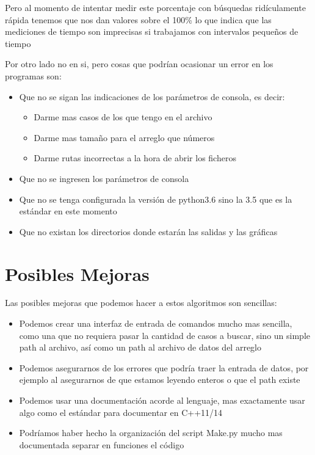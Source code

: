\documentclass[12pt, fleqn]{article}                             %
\newcommand \Quote {\qq}                                        %
\theoremstyle{break}                                            %
\begin{document}
    Pero al momento de intentar medir este porcentaje con búsquedas ridículamente
    rápida tenemos que nos dan valores sobre el 100\% lo que indica que las mediciones
    de tiempo son imprecisas si trabajamos con intervalos pequeños de tiempo

    Por otro lado no \Quote{errores} en si, pero cosas que podrían ocasionar un error
    en los programas son:
    \begin{itemize}
        \item Que no se sigan las indicaciones de los parámetros de consola, es decir:
        \begin{itemize}
            \item Darme mas casos de los que tengo en el archivo
            \item Darme mas tamaño para el arreglo que números
            \item Darme rutas incorrectas a la hora de abrir los ficheros
        \end{itemize}
        \item Que no se ingresen los parámetros de consola
        \item Que no se tenga configurada la versión de python3.6 sino la 3.5 que es
        la estándar en este momento
        \item Que no existan los directorios donde estarán las salidas y las gráficas
    \end{itemize}



\clearpage
\section{Posibles Mejoras}


    Las posibles mejoras que podemos hacer a estos algoritmos son sencillas:

    \begin{itemize}
        \item 
            Podemos crear una interfaz de entrada de comandos mucho mas sencilla, como
            una que no requiera pasar la cantidad de casos a buscar, sino un simple
            path al archivo, así como un path al archivo de datos del arreglo

        \item
            Podemos asegurarnos de los errores que podría traer la entrada de datos,
            por ejemplo al asegurarnos de que estamos leyendo enteros o que el path
            existe

        \item
            Podemos usar una documentación acorde al lenguaje, mas exactamente usar algo
            como el estándar para documentar en C++11/14

        \item
            Podríamos haber hecho la organización del script Make.py mucho mas documentada
            separar en funciones el código
    \end{itemize}
\end{document}
